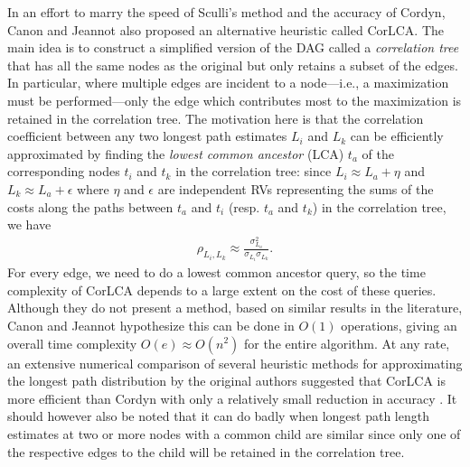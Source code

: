 \documentclass[12pt]{article}
\begin{document}
In an effort to marry the speed of Sculli's method and the accuracy of Cordyn, Canon and Jeannot also proposed an alternative heuristic called CorLCA. The main idea is to construct a simplified version of the DAG called a {\em correlation tree} that has all the same nodes as the original but only retains a subset of the edges. In particular, where multiple edges are incident to a node---i.e., a maximization must be performed---only the edge which contributes most to the maximization is retained in the correlation tree. The motivation here is that the correlation coefficient between any two longest path estimates $L_i$ and $L_k$ can be efficiently approximated by finding the {\em lowest common ancestor} (LCA) $t_{a}$ of the corresponding nodes $t_i$ and $t_k$ in the correlation tree: since $L_i \approx L_a + \eta$ and $L_k \approx L_a + \epsilon$ where $\eta$ and $\epsilon$ are independent RVs representing the sums of the costs along the paths between $t_a$ and $t_i$ (resp. $t_a$ and $t_k$) in the correlation tree, we have
\begin{align*}
  \rho_{L_i, L_k} \approx \frac{\sigma_{L_a}^2}{\sigma_{L_i}\sigma_{L_k}}. %
  \end{align*}
For every edge, we need to do a lowest common ancestor query, so the time complexity of CorLCA depends to a large extent on the cost of these queries. Although they do not present a method, based on similar results in the literature, Canon and Jeannot hypothesize this can be done in $O(1)$ operations, giving an overall time complexity $O(e) \approx O(n^2)$ for the entire algorithm. At any rate, an extensive numerical comparison of several heuristic methods for approximating the longest path distribution by the original authors suggested that CorLCA is more efficient than Cordyn with only a relatively small reduction in accuracy \cite{can16}. It should however also be noted that it can do badly when longest path length estimates at two or more nodes with a common child are similar since only one of the respective edges to the child will be retained in the correlation tree.   
\end{document}
